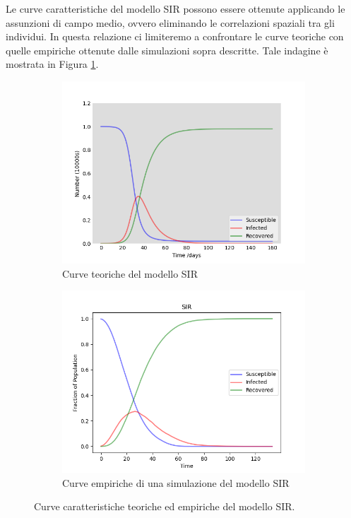 \documentclass{article}
\begin{document}
    Le curve caratteristiche del modello SIR possono essere ottenute applicando le assunzioni di campo medio, ovvero
    eliminando le correlazioni spaziali tra gli individui. In questa relazione ci limiteremo a confrontare le curve teoriche
    con quelle empiriche ottenute dalle simulazioni sopra descritte. Tale indagine è mostrata in Figura \ref{fig:sir_curves}.
    \begin{figure}[H]
        \centering
        \begin{subfigure}[b]{0.49\linewidth}
         \centering
         \includegraphics[width=\linewidth]{../images/sir_equations}
            \caption{Curve teoriche del modello SIR}
        \end{subfigure}
        \hfill
        \begin{subfigure}[b]{0.49\linewidth}
         \centering
         \includegraphics[width=\linewidth]{../images/sir_curves1}
            \caption{Curve empiriche di una simulazione del modello SIR}
        \end{subfigure}
        \caption{Curve caratteristiche teoriche ed empiriche del modello SIR.}
        \label{fig:sir_curves}
    \end{figure}
\end{document}
